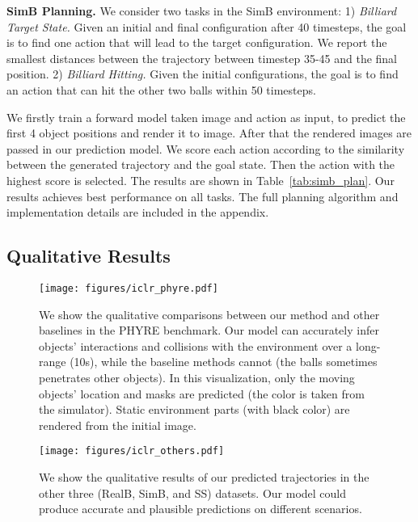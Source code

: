 \documentclass{article} \usepackage{iclr2021_conference,times}
\begin{document}
\textbf{SimB Planning.} We consider two tasks in the SimB environment: 1) \textit{Billiard Target State.} Given an initial and final configuration after 40 timesteps, the goal is to find one action that will lead to the target configuration. We report the smallest distances between the trajectory between timestep 35-45 and the final position. 2) \textit{Billiard Hitting.} Given the initial configurations, the goal is to find an action that can hit the other two balls within 50 timesteps. 

We firstly train a forward model taken image and action as input, to predict the first 4 object positions and render it to image. After that the rendered images are passed in our prediction model. We score each action according to the similarity between the generated trajectory and the goal state. Then the action with the highest score is selected. The results are shown in Table~\ref{tab:simb_plan}. Our results achieves best performance on all tasks. The full planning algorithm and implementation details are included in the appendix.

\vspace{-0.5em}
\subsection{Qualitative Results}
\vspace{-0.5em}

\begin{figure}[t]
{
\centering
\texttt{[image: figures/iclr\_phyre.pdf]}
\vspace{-1.3em}
\caption{We show the qualitative comparisons between our method and other baselines in the PHYRE benchmark. Our model can accurately infer objects' interactions and collisions with the environment over a long-range (10s), while the baseline methods cannot (the balls sometimes penetrates other objects). In this visualization, only the moving objects' location and masks are predicted (the color is taken from the simulator). Static environment parts (with black color) are rendered from the initial image.}
\label{fig:rst_phyre}
}
\end{figure}

\begin{figure}[t]
{
\centering
\texttt{[image: figures/iclr\_others.pdf]}
\vspace{-0.9em}
\caption{We show the qualitative results of our predicted trajectories in the other three (RealB, SimB, and SS) datasets. Our model could produce accurate and plausible predictions on different scenarios.}
\label{fig:rst_others}
\vspace{-1em}
}
\end{figure}
\end{document}
